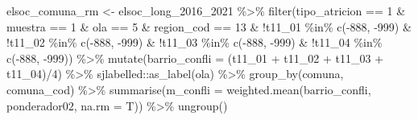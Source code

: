 \documentclass[
  12pt,
]{book}
\newenvironment{Shaded}{\begin{snugshade}}{\end{snugshade}}
\newcommand{\AttributeTok}[1]{\textcolor[rgb]{0.77,0.63,0.00}{#1}}
\newcommand{\DecValTok}[1]{\textcolor[rgb]{0.00,0.00,0.81}{#1}}
\newcommand{\FunctionTok}[1]{\textcolor[rgb]{0.00,0.00,0.00}{#1}}
\newcommand{\NormalTok}[1]{#1}
\newcommand{\OtherTok}[1]{\textcolor[rgb]{0.56,0.35,0.01}{#1}}
\newcommand{\SpecialCharTok}[1]{\textcolor[rgb]{0.00,0.00,0.00}{#1}}
\begin{document}
\begin{Shaded}
\begin{Highlighting}[]
\NormalTok{elsoc\_comuna\_rm }\OtherTok{\textless{}{-}}\NormalTok{ elsoc\_long\_2016\_2021 }\SpecialCharTok{\%\textgreater{}\%} 
  \FunctionTok{filter}\NormalTok{(tipo\_atricion }\SpecialCharTok{==} \DecValTok{1} \SpecialCharTok{\&}\NormalTok{ muestra }\SpecialCharTok{==} \DecValTok{1} \SpecialCharTok{\&}\NormalTok{ ola }\SpecialCharTok{==} \DecValTok{5} \SpecialCharTok{\&}\NormalTok{ region\_cod }\SpecialCharTok{==} \DecValTok{13} \SpecialCharTok{\&} \SpecialCharTok{!}\NormalTok{t11\_01 }\SpecialCharTok{\%in\%} \FunctionTok{c}\NormalTok{(}\SpecialCharTok{{-}}\DecValTok{888}\NormalTok{, }\SpecialCharTok{{-}}\DecValTok{999}\NormalTok{) }\SpecialCharTok{\&}
           \SpecialCharTok{!}\NormalTok{t11\_02 }\SpecialCharTok{\%in\%} \FunctionTok{c}\NormalTok{(}\SpecialCharTok{{-}}\DecValTok{888}\NormalTok{, }\SpecialCharTok{{-}}\DecValTok{999}\NormalTok{) }\SpecialCharTok{\&} \SpecialCharTok{!}\NormalTok{t11\_03 }\SpecialCharTok{\%in\%} \FunctionTok{c}\NormalTok{(}\SpecialCharTok{{-}}\DecValTok{888}\NormalTok{, }\SpecialCharTok{{-}}\DecValTok{999}\NormalTok{) }\SpecialCharTok{\&} \SpecialCharTok{!}\NormalTok{t11\_04 }\SpecialCharTok{\%in\%} \FunctionTok{c}\NormalTok{(}\SpecialCharTok{{-}}\DecValTok{888}\NormalTok{, }\SpecialCharTok{{-}}\DecValTok{999}\NormalTok{)) }\SpecialCharTok{\%\textgreater{}\%} 
  \FunctionTok{mutate}\NormalTok{(}\AttributeTok{barrio\_confli =}\NormalTok{ (t11\_01 }\SpecialCharTok{+}\NormalTok{ t11\_02 }\SpecialCharTok{+}\NormalTok{ t11\_03 }\SpecialCharTok{+}\NormalTok{ t11\_04)}\SpecialCharTok{/}\DecValTok{4}\NormalTok{) }\SpecialCharTok{\%\textgreater{}\%}
\NormalTok{  sjlabelled}\SpecialCharTok{::}\FunctionTok{as\_label}\NormalTok{(ola) }\SpecialCharTok{\%\textgreater{}\%} 
  \FunctionTok{group\_by}\NormalTok{(comuna, comuna\_cod) }\SpecialCharTok{\%\textgreater{}\%} 
  \FunctionTok{summarise}\NormalTok{(}\AttributeTok{m\_confli =} \FunctionTok{weighted.mean}\NormalTok{(barrio\_confli, ponderador02, }\AttributeTok{na.rm =}\NormalTok{ T)) }\SpecialCharTok{\%\textgreater{}\%} 
  \FunctionTok{ungroup}\NormalTok{() }


\end{Highlighting}
\end{Shaded}
\end{document}
